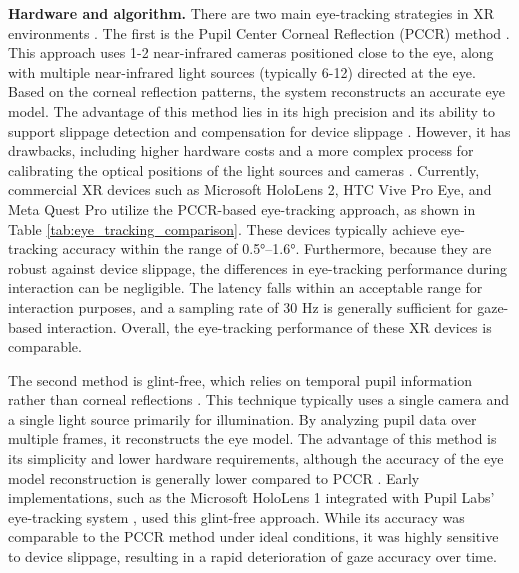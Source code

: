 \documentclass[review]{fcs}
\newcommand{\revise}[2]{\textcolor[rgb]{0,0,0}{#2}}
\begin{document}
\textbf{Hardware and algorithm.} There are two main eye-tracking strategies in XR environments \cite{DBLP:conf/ismar/WangZLL21}. The first is the Pupil Center Corneal Reflection (PCCR) method \cite{DBLP:journals/tbe/GuestrinE06, DBLP:journals/corr/abs-2003-08806}. This approach uses 1-2 near-infrared cameras positioned close to the eye, along with multiple near-infrared light sources (typically 6-12) directed at the eye. Based on the corneal reflection patterns, the system reconstructs an accurate eye model. The advantage of this method lies in its high precision and its ability to support slippage detection and compensation for device slippage \cite{DBLP:conf/etra/SantiniNK19}. However, it has drawbacks, including higher hardware costs and a more complex process for calibrating the optical positions of the light sources and cameras \cite{6949395}.
\revise{}{
Currently, commercial XR devices such as Microsoft HoloLens 2, HTC Vive Pro Eye, and Meta Quest Pro utilize the PCCR-based eye-tracking approach, as shown in Table \ref{tab:eye_tracking_comparison}. These devices typically achieve eye-tracking accuracy within the range of 0.5°–1.6°. Furthermore, because they are robust against device slippage, the differences in eye-tracking performance during interaction can be negligible. The latency falls within an acceptable range for interaction purposes, and a sampling rate of 30 Hz is generally sufficient for gaze-based interaction. Overall, the eye-tracking performance of these XR devices is comparable.}

The second method is glint-free, which relies on temporal pupil information rather than corneal reflections \cite{DBLP:conf/etra/DierkesKB19, DBLP:conf/chi/KytoEPLB18}. This technique typically uses a single camera and a single light source primarily for illumination. By analyzing pupil data over multiple frames, it reconstructs the eye model. The advantage of this method is its simplicity and lower hardware requirements, although the accuracy of the eye model reconstruction is generally lower compared to PCCR \cite{DBLP:journals/tvcg/WangZ022}.
\revise{}{Early implementations, such as the Microsoft HoloLens 1 integrated with Pupil Labs' eye-tracking system \cite{DBLP:conf/chi/KytoEPLB18}, used this glint-free approach. While its accuracy was comparable to the PCCR method under ideal conditions, it was highly sensitive to device slippage, resulting in a rapid deterioration of gaze accuracy over time.}



\end{document}

